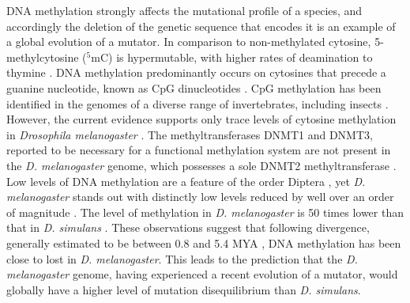DNA methylation strongly affects the mutational profile of a species, and accordingly the deletion of the genetic sequence that encodes it is an example of a global evolution of a mutator. In comparison to non-methylated cytosine, 5-methylcytosine ($^5$mC) is hypermutable, with higher rates of deamination to thymine \citep{Coulondre1978MolecularColi}. DNA methylation predominantly occurs on cytosines that precede a guanine nucleotide, known as CpG dinucleotides \citep{Holliday1975DNADevelopment}. CpG methylation has been identified in the genomes of a diverse range of invertebrates, including insects \citep{Wang2010EstimatingLoci}. However, the current evidence supports only trace levels of cytosine methylation in \textit{Drosophila melanogaster} \citep{Capuano2014CytosineSpecies, Deshmukh2018LevelsGenome}. The methyltransferases DNMT1 and DNMT3, reported to be necessary for a functional methylation system are not present in the \textit{D. melanogaster} genome, which possesses a sole DNMT2 methyltransferase \citep{Goll2005EukaryoticMethyltransferases, Tweedie1999VestigesMelanogaster}. Low levels of DNA methylation are a feature of the order Diptera \citep{Bewick2017EvolutionInsects, Provataris2018SignaturesHolometabola}, yet \textit{D. melanogaster} stands out with distinctly low levels reduced by well over an order of magnitude \citep{Deshmukh2018LevelsGenome}. The level of methylation in \textit{D. melanogaster} is 50 times lower than that in \textit{D. simulans} \citep{Deshmukh2018LevelsGenome}. These observations suggest that following divergence, generally estimated to be between 0.8 and 5.4 MYA \citep{Cutter2008DivergenceRate, Wang2010EstimatingLoci, Tamura2004TemporalClocks}, DNA methylation has been close to lost in \textit{D. melanogaster}. This leads to the prediction that the \textit{D. melanogaster} genome, having experienced a recent evolution of a mutator, would globally have a higher level of mutation disequilibrium than \textit{D. simulans}. 
 
